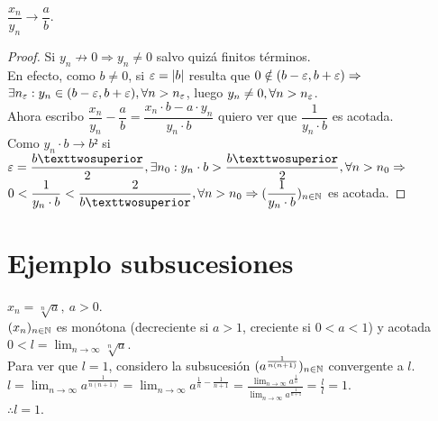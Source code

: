 \clearpage

\begin{prop}
  $\dfrac{x_n}{y_n} \to \dfrac{a}{b}$.
  \begin{proof}
    Si $y_n \not \to 0 \Rightarrow y_n \neq 0$ salvo quizá finitos términos. \\
    En efecto, como $b \neq 0$, si $\varepsilon = |b|$ resulta que $0 \notin (b - \varepsilon, b + \varepsilon) \Rightarrow$ \\
    $\exists n_{\varepsilon} : y_n \in (b-\varepsilon, b+\varepsilon), \forall n > n_{\varepsilon}$, luego $y_n \neq 0, \forall n > n_{\varepsilon}$. \\

    Ahora escribo $\dfrac{x_n}{y_n} - \dfrac{a}{b} = \dfrac{x_n \cdot b - a \cdot y_n}{y_n \cdot b}$ quiero ver que $\dfrac{1}{y_n \cdot b}$ es acotada. \\
    Como $y_n \cdot b \to b²$ si $\e = \dfrac{b²}{2}, \exists n_0 : y_n \cdot b > \dfrac{b²}{2}, \forall n > n_0 \Rightarrow$ \\
    $0 < \dfrac{1}{y_n \cdot b} < \dfrac{2}{b²}, \forall n > n_0 \Rightarrow (\dfrac{1}{y_n \cdot b})_{n \in \N}$ es acotada.
  \end{proof}
\end{prop}

\section{Ejemplo subsucesiones}

\begin{eg}
  $x_n = \sqrt[n]{a}, \ a > 0$. \\
  $(x_n)_{n \in \mathbb{N}}$ es monótona (decreciente si $a > 1$, creciente si $0 < a < 1$) y acotada $0 < l = \lim_{n \to \infty} \sqrt[n]{a}$. \\
  Para ver que $l = 1$, considero la subsucesión $(a^{\frac{1}{n(n+1)}})_{n \in \mathbb{N}}$ convergente a $l$. \\
  $l = \lim_{n \to \infty} a^{\frac{1}{n(n+1)}} = \lim_{n \to \infty} a^{\frac{1}{n} - \frac{1}{n+1}} =
    \frac{\lim_{n \to \infty} a^{\frac{1}{n}}}{\lim_{n \to \infty} a^{\frac{1}{n+1}}} = \frac{l}{l} = 1.$ \\
  $\therefore l = 1$.
\end{eg}

